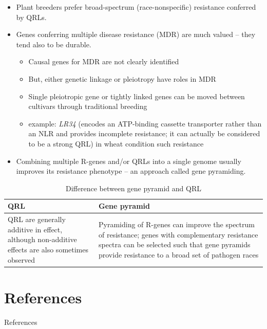 \documentclass[11pt,dvipsnames,ignorenonframetext,aspectratio=169]{beamer}
\newif\ifbibliography
\providecommand{\tightlist}{%
  \setlength{\itemsep}{0pt}\setlength{\parskip}{0pt}}
\newcommand{\bitemize}{\begin{itemize}}
\newcommand{\eitemize}{\end{itemize}}
\begin{document}
\begin{frame}{}
\protect\hypertarget{section-21}{}
\small

\begin{itemize}
\tightlist
\item
  Plant breeders prefer broad-spectrum (race-nonspecific) resistance
  conferred by QRLs.
\item
  Genes conferring multiple disease resistance (MDR) are much valued --
  they tend also to be durable. \bitemize \footnotesize

  \item

  Causal genes for MDR are not clearly identified

  \item

  But, either genetic linkage or pleiotropy have roles in MDR

  \item

  Single pleiotropic gene or tightly linked genes can be moved between
  cultivars through traditional breeding

  \item

  example: \textit{LR34} (encodes an ATP-binding cassette transporter
  rather than an NLR and provides incomplete resistance;
  \alert{it can actually be considered to be a strong QRL}) in wheat
  condition such resistance \eitemize
\item
  Combining multiple R-genes and/or QRLs into a single genome usually
  improves its resistance phenotype -- an approach called gene
  pyramiding.
\end{itemize}

\begin{table}

\caption{\label{tab:diff-qrl-pyramid}Difference between gene pyramid and QRL}
\centering
\fontsize{6}{8}\selectfont
\begin{tabular}[t]{>{\raggedright\arraybackslash}p{24em}>{\raggedright\arraybackslash}p{30em}}
\toprule
QRL & Gene pyramid\\
\midrule
QRL are generally additive in effect, although non-additive effects are also sometimes observed & Pyramiding of R-genes can improve the spectrum of resistance; genes with complementary resistance spectra can be selected such that gene pyramids provide resistance to a broad set of pathogen races\\
\bottomrule
\end{tabular}
\end{table}
\end{frame}

\hypertarget{references}{%
\section{References}\label{references}}

\begin{frame}{References}
\renewcommand{\bibname}{References} 
\scriptsize
\end{frame}

          \begin{frame}[allowframebreaks]{}
    \bibliographytrue
    
    \end{frame}
  
\end{document}
